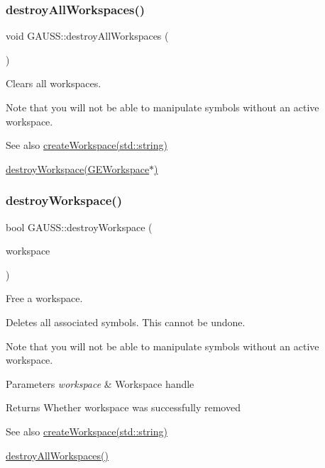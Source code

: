 \subsubsection{\texorpdfstring{destroy\+All\+Workspaces()}{destroyAllWorkspaces()}}
{\footnotesize\ttfamily void G\+A\+U\+S\+S\+::destroy\+All\+Workspaces (\begin{DoxyParamCaption}{ }\end{DoxyParamCaption})}



Clears all workspaces. 

Note that you will not be able to manipulate symbols without an active workspace.

\begin{DoxySeeAlso}{See also}
\hyperlink{class_g_a_u_s_s_a93c2f73d4982037cccfeeeb81dbe7dd2}{create\+Workspace(std\+::string)} 

\hyperlink{class_g_a_u_s_s_ab73fd6b8f6cfd5abb906b8e4e344c007}{destroy\+Workspace(\+G\+E\+Workspace$\ast$)} 
\end{DoxySeeAlso}
\mbox{\label{class_g_a_u_s_s_ab73fd6b8f6cfd5abb906b8e4e344c007}} 
\subsubsection{\texorpdfstring{destroy\+Workspace()}{destroyWorkspace()}}
{\footnotesize\ttfamily bool G\+A\+U\+S\+S\+::destroy\+Workspace (\begin{DoxyParamCaption}\item[{\hyperlink{class_g_e_workspace}{G\+E\+Workspace} $\ast$}]{workspace }\end{DoxyParamCaption})}



Free a workspace. 

Deletes all associated symbols. This cannot be undone.

Note that you will not be able to manipulate symbols without an active workspace.


\begin{DoxyParams}{Parameters}
{\em workspace} & Workspace handle \\
\hline
\end{DoxyParams}
\begin{DoxyReturn}{Returns}
Whether workspace was successfully removed
\end{DoxyReturn}
\begin{DoxySeeAlso}{See also}
\hyperlink{class_g_a_u_s_s_a93c2f73d4982037cccfeeeb81dbe7dd2}{create\+Workspace(std\+::string)} 

\hyperlink{class_g_a_u_s_s_ab9515a6de5028f18138e6c87e1512c91}{destroy\+All\+Workspaces()} 
\end{DoxySeeAlso}
\mbox{\label{class_g_a_u_s_s_ac2624100ec1467f7c7b0626973c7e1fc}} 
